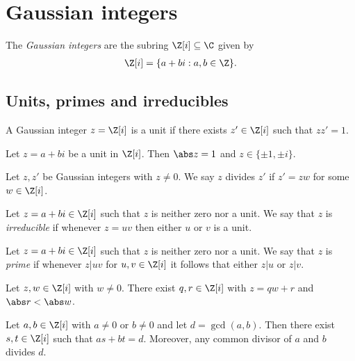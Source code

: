 \documentclass{article}
\begin{document}
\section{Gaussian integers}

\begin{definition}
	The \emph{Gaussian integers} are the subring $\Z[i]\subseteq\C$ given by
	\begin{align*}
		\Z[i]=\{a+bi:a,b\in\Z\}.
	\end{align*}
\end{definition}

\subsection{Units, primes and irreducibles}

\begin{definition}
	A Gaussian integer $z=\Z[i]$ is a unit if there exists $z'\in\Z[i]$ such that
	$zz'=1$.
\end{definition}

\begin{lemma}[Lecture 13]
	Let $z=a+bi$ be a unit in $\Z[i]$. Then $\abs z=1$ and $z\in\{\pm 1, \pm i\}$.
\end{lemma}

\begin{definition}
	Let $z,z'$ be Gaussian integers with $z\not=0$. We say $z$ divides $z'$ if $z'=zw$ for
	some $w\in\Z[i]$.
\end{definition}

\begin{definition}[Irreducibles]
	Let $z=a+bi\in\Z[i]$ such that $z$ is neither zero nor a unit. We say that $z$ is \emph{irreducible}
	if whenever $z=uv$ then either $u$ or $v$ is a unit.
\end{definition}

\begin{definition}
	Let $z=a+bi\in\Z[i]$ such that $z$ is neither zero nor a unit. We say that $z$ is \emph{prime} if
	whenever $z|uv$ for $u,v\in\Z[i]$ it follows that either $z|u$ or $z|v$.
\end{definition}

\begin{theorem}
	Let $z,w\in\Z[i]$ with $w\not=0$. There exist $q,r\in\Z[i]$ with $z=qw+r$ and $\abs r<\abs w$.
\end{theorem}

\begin{theorem}
	Let $a,b\in\Z[i]$ with $a\not=0$ or $b\not=0$ and let $d=\gcd(a,b)$. Then there exist $s,t\in\Z[i]$
	such that $as+bt=d$. Moreover, any common divisor of $a$ and $b$ divides $d$.
\end{theorem}
\end{document}
